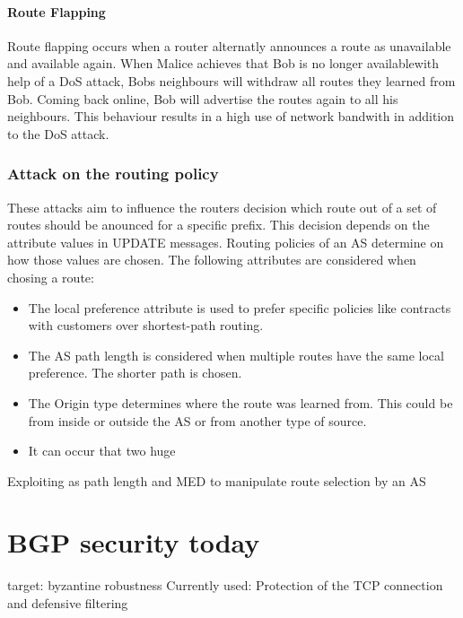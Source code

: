 \documentclass[12pt]{IEEEtran}
\begin{document}
		\paragraph{Route Flapping}
		Route flapping occurs when a router alternatly announces a route as unavailable and available again. When Malice achieves that Bob is no longer availablewith help of a DoS attack, Bobs neighbours will withdraw all routes they learned from Bob. Coming back online, Bob will advertise the routes again to all his neighbours.
		This behaviour results in a high use of network bandwith in addition to the DoS attack. 

		\subsubsection{Attack on the routing policy} 
		
		These attacks aim to influence the routers decision which route out of a set of routes should be anounced for a specific prefix. This decision depends on the attribute values in UPDATE messages. Routing policies of an AS determine on how those values are chosen. The following attributes are considered when chosing a route:
		\begin{itemize}
			\item The local preference attribute is used to prefer specific policies like contracts with customers over shortest-path routing.
			\item The AS path length is considered when multiple routes have the same local preference. The shorter path is chosen.
			\item The Origin type determines where the route was learned from. This could be from inside or outside the AS or from another type of source.
			\item It can occur that two huge 
		\end{itemize}
		Exploiting as path length and MED to manipulate route selection by an AS



       \section{BGP security today}
	target:	byzantine robustness
	Currently used: Protection of the TCP connection and defensive filtering
	
\end{document}
